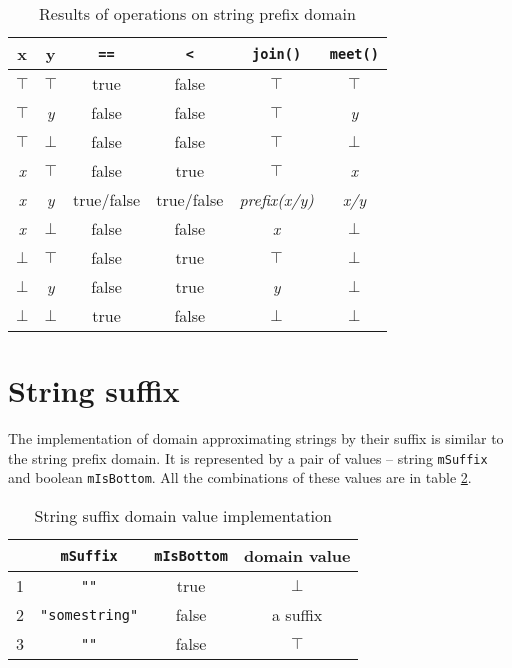 \documentclass[12pt,final,oneside]{fithesis2}
\theoremstyle{definition}
\begin{document}
\begin{table}[ht]
\centering
\begin{tabular}{c|c|c|c|c|c}
 x & y & \texttt{==} & \texttt{<} & \texttt{join()} & \texttt{meet()} \\
\hline
$\top$     & $\top$     & true       & false      & $\top$       & $\top$ \\
$\top$     & \textit{y} & false      & false      & $\top$       & \textit{y} \\
$\top$     & $\bot$     & false      & false      & $\top$       & $\bot$ \\
\textit{x} & $\top$     & false      & true       & $\top$       & \textit{x} \\
\textit{x} & \textit{y} & true/false & true/false & \textit{prefix(x/y)} & \textit{x/y} \\
\textit{x} & $\bot$     & false      & false      & \textit{x}   & $\bot$ \\
$\bot$     & $\top$     & false      & true       & $\top$       & $\bot$ \\
$\bot$     & \textit{y} & false      & true       & \textit{y}   & $\bot$ \\
$\bot$     & $\bot$     & true       & false      & $\bot$       & $\bot$
\end{tabular}
\caption{Results of operations on string prefix domain}
\label{tab:prefixops}
\end{table}


\section{String suffix}

The implementation of domain approximating strings by their suffix is similar
to the string prefix domain. It is represented by a pair of values -- string
\texttt{mSuffix} and boolean \texttt{mIsBottom}. All the combinations of these
values are in table \ref{tab:stringsuffix}.

\begin{table}[ht]
\centering
\begin{tabular}{r|c|c|c}
  & \texttt{mSuffix}      & \texttt{mIsBottom} & domain value \\
\hline
1 & \texttt{""}           & true      & $\bot$ \\
2 & \texttt{"somestring"} & false     & a suffix \\
3 & \texttt{""}           & false     & $\top$
\end{tabular}
\caption{String suffix domain value implementation}
\label{tab:stringsuffix}
\end{table}
\end{document}

